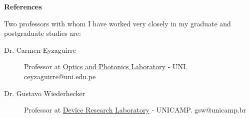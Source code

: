 \documentclass[letterpaper, 12pt]{article}[leftmargin=*]
\renewcommand{\section}[2]{
  \colorbox{secondary}{\color{white}\raggedbottom\normalsize\textbf{{#1}{\hspace{7pt}#2}}}
}
\begin{document}
\section{\faTripadvisor}{References}

\vspace{5pt}
Two professors with whom I have worked very closely in my graduate and postgraduate studies are:
\begin{description}
	\item[Dr. Carmen Eyzaguirre] Professor at \href{https://fc.uni.edu.pe/fc/index.php/noticias-secundarias/item/12-eyzaguirre-gorvenia-carmen}{Optics and Photonics Laboratory} - UNI. \href{ceyzaguirre@uni.edu.pe}{\faEnvelopeO} ceyzaguirre@uni.edu.pe
	\item[Dr. Gustavo Wiederhecker] Professor at \href{https://sites.ifi.unicamp.br/lpd/}{Device Research Laboratory} - UNICAMP. \href{gsw@unicamp.br}{\faEnvelopeO} gsw@unicamp.br
\end{description}
\end{document}
